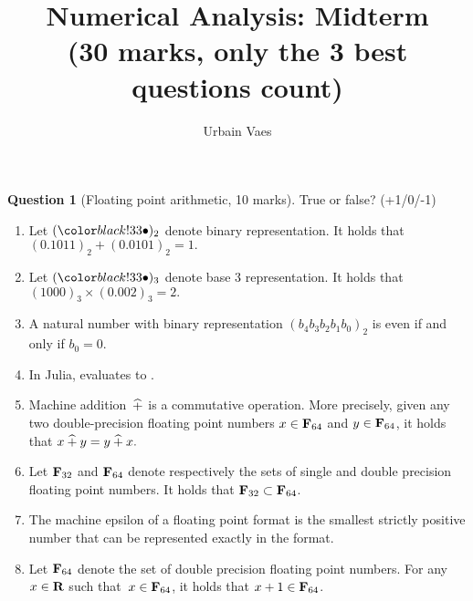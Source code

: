\documentclass[11pt]{article}
\theoremstyle{definition}
\newtheorem{question}{Question}
\begin{document}
\title{Numerical Analysis: Midterm \\
\small{(\textbf{30 marks}, only the 3 best questions count)}}
\author{Urbain Vaes}
\maketitle

\begin{question}
    [Floating point arithmetic, 10 marks]
    True or false? (+1/0/-1)
    \begin{enumerate}
        \item
            Let $(\placeholder)_2$ denote binary representation.
            It holds that
            \(
                (0.1011)_2 + (0.0101)_2 = 1.
            \)

        \item
            Let $(\placeholder)_3$ denote base 3 representation.
            It holds that
            \(
                (1000)_3 \times (0.002)_3 = 2.
            \)

        \item
            A natural number with binary representation $(b_4 b_3 b_2 b_1 b_0)_2$ is even if and only if $b_0 = 0$.

        \item
            In Julia,  evaluates to .

        \item
            Machine addition~$\mathbin{\widehat +}$ is a commutative operation.
            More precisely, given any two double-precision floating point numbers $x \in \mathbf F_{64}$ and $y \in \mathbf F_{64}$,
            it holds that
            \(
                x \mathbin{\widehat +} y = y \mathbin{\widehat +} x.
            \)

        \item
            Let $\mathbf F_{32}$ and $\mathbf F_{64}$ denote respectively the sets of single and double precision floating point numbers.
            It holds that $\mathbf F_{32} \subset \mathbf F_{64}$.

        \item
            The machine epsilon of a floating point format is the smallest strictly positive number that can be represented exactly in the format.

        \item
            Let $\mathbf F_{64}$ denote the set of double precision floating point numbers.
            For any $x \in \mathbf R$ such that~$x \in \mathbf F_{64}$,
            it holds that $x + 1 \in \mathbf F_{64}$.


\end{enumerate}
\end{question}
\end{document}
